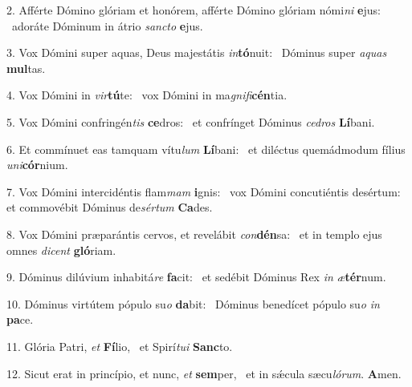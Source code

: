 2. Afférte Dómino glóriam et honórem, afférte Dómino glóriam nómi\textit{ni} \textbf{e}jus: \ast\  adoráte Dóminum in átrio \textit{sanc}\textit{to} \textbf{e}jus.\

3. Vox Dómini super aquas, Deus majestátis \textit{in}\textbf{tó}nuit: \ast\  Dóminus super \textit{a}\textit{quas} \textbf{mul}tas.\

4. Vox Dómini in \textit{vir}\textbf{tú}te: \ast\  vox Dómini in ma\textit{gni}\textit{fi}\textbf{cén}tia.\

5. Vox Dómini confringén\textit{tis} \textbf{ce}dros: \ast\  et confrínget Dóminus \textit{ce}\textit{dros} \textbf{Lí}bani.\

6. Et commínuet eas tamquam vítu\textit{lum} \textbf{Lí}bani: \ast\  et diléctus quemádmodum fílius \textit{u}\textit{ni}\textbf{cór}nium.\

7. Vox Dómini intercidéntis flam\textit{mam} \textbf{i}gnis: \ast\  vox Dómini concutiéntis desértum: et commovébit Dóminus de\textit{sér}\textit{tum} \textbf{Ca}des.\

8. Vox Dómini præparántis cervos, et revelábit \textit{con}\textbf{dén}sa: \ast\  et in templo ejus omnes \textit{di}\textit{cent} \textbf{gló}riam.\

9. Dóminus dilúvium inhabitá\textit{re} \textbf{fa}cit: \ast\  et sedébit Dóminus Rex \textit{in} \textit{æ}\textbf{tér}num.\

10. Dóminus virtútem pópulo su\textit{o} \textbf{da}bit: \ast\  Dóminus benedícet pópulo su\textit{o} \textit{in} \textbf{pa}ce.\

11. Glória Patri, \textit{et} \textbf{Fí}lio, \ast\  et Spirí\textit{tu}\textit{i} \textbf{Sanc}to.\

12. Sicut erat in princípio, et nunc, \textit{et} \textbf{sem}per, \ast\  et in sǽcula sæcu\textit{ló}\textit{rum}. \textbf{A}men.\

